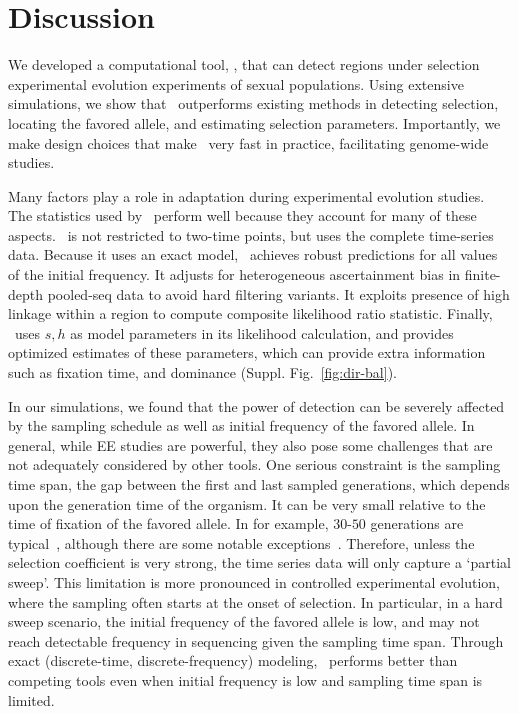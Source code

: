 \section{Discussion}
We developed a computational tool, \comale, that can detect regions
under selection experimental evolution experiments of sexual
populations. Using extensive simulations, we show that \comale\
outperforms existing methods in detecting selection, locating the
favored allele, and estimating selection parameters. Importantly, we
make design choices that make \comale\ very fast in practice,
facilitating genome-wide studies.


Many factors play a role in adaptation during experimental evolution
studies. The statistics used by \comale\ perform well because they
account for many of these aspects. \comale\ is not restricted to
two-time points, but uses the complete time-series data. Because it
uses an exact model, \comale\ achieves robust predictions for all
values of the initial frequency. It adjusts for heterogeneous
ascertainment bias in finite-depth pooled-seq data to avoid hard
filtering variants. It exploits presence of high linkage within a
region to compute composite likelihood ratio statistic. Finally,
\comale\ uses $s,h$ as model parameters in its likelihood calculation,
and provides optimized estimates of these parameters, which can
provide extra information such as fixation time, and dominance (Suppl. 
Fig.~\ref{fig:dir-bal}).

In our simulations, we found that the power of detection can be
severely affected by the sampling schedule as well as initial
frequency of the favored allele.  In general, while EE studies are
powerful, they also pose some challenges that are not adequately
considered by other tools. One serious constraint is the
sampling time span, the gap between the first and last sampled
generations, which depends upon the generation time of the
organism. It can be very small relative to the time of fixation of the
favored allele. In \dmel for example, $30$-$50$ generations are
typical~\cite{kofler2013guide}, although there are some notable
exceptions~\cite{zhou2011experimental}.  Therefore, unless the
selection coefficient is very strong, the time series data will only
capture a `partial sweep'. This limitation is more pronounced in
controlled experimental evolution, where the sampling often starts at
the onset of selection. In particular, in a hard sweep scenario, the
initial frequency of the favored allele is low, and may not reach detectable 
frequency in sequencing given the sampling time span. Through exact
(discrete-time, discrete-frequency) modeling, \comale\ performs better
than competing tools even when initial frequency is low and
sampling time span is limited.


